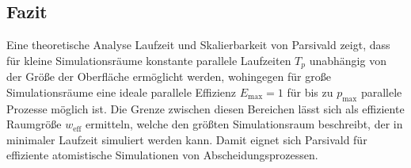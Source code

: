 \subsection{Fazit}

Eine theoretische Analyse Laufzeit und Skalierbarkeit von Parsivald zeigt, dass für kleine Simulationsräume konstante parallele Laufzeiten $T_p$ unabhängig von der Größe der Oberfläche ermöglicht werden, wohingegen für große Simulationsräume eine ideale parallele Effizienz $E_\text{max} = 1$ für bis zu $p_\text{max}$ parallele Prozesse möglich ist.
Die Grenze zwischen diesen Bereichen lässt sich als effiziente Raumgröße $w_\text{eff}$ ermitteln, welche den größten Simulationsraum beschreibt, der in minimaler Laufzeit simuliert werden kann.
Damit eignet sich Parsivald für effiziente atomistische Simulationen von Abscheidungsprozessen.

